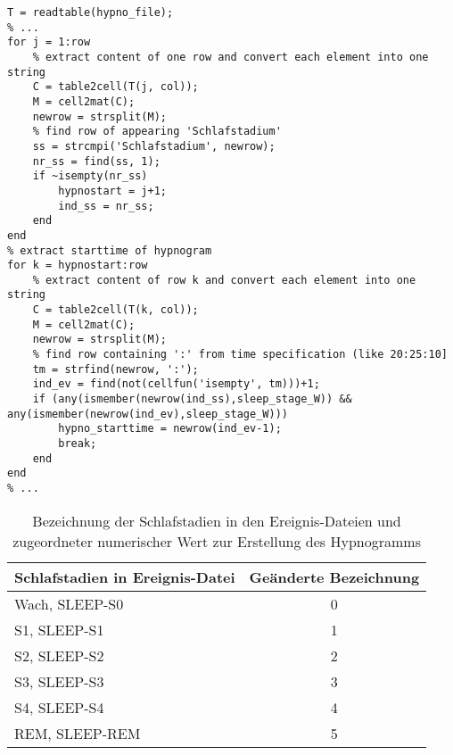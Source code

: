 
\begin{lstlisting}[caption={Implementierung Kriterium D1 in Skript restructure\_hypnogram.m}, label={lst:D1}]
T = readtable(hypno_file);
% ...
for j = 1:row
    % extract content of one row and convert each element into one string
    C = table2cell(T(j, col));
    M = cell2mat(C);
    newrow = strsplit(M);
    % find row of appearing 'Schlafstadium'
    ss = strcmpi('Schlafstadium', newrow);
    nr_ss = find(ss, 1);
    if ~isempty(nr_ss)
        hypnostart = j+1;
        ind_ss = nr_ss;
    end
end
% extract starttime of hypnogram
for k = hypnostart:row
    % extract content of row k and convert each element into one string
    C = table2cell(T(k, col));
    M = cell2mat(C);
    newrow = strsplit(M);
    % find row containing ':' from time specification (like 20:25:10]
    tm = strfind(newrow, ':');
    ind_ev = find(not(cellfun('isempty', tm)))+1;
    if (any(ismember(newrow(ind_ss),sleep_stage_W)) && any(ismember(newrow(ind_ev),sleep_stage_W)))
        hypno_starttime = newrow(ind_ev-1);
        break;
    end
end
% ...
\end{lstlisting}

\begin{table}[H] 
\centering
\begin{tabularx}{0.785\textwidth}{Xc}
\toprule
\multicolumn{1}{l}{\textbf{Schlafstadien in Ereignis-Datei}} & \multicolumn{1}{c}{\textbf{Geänderte Bezeichnung}}\\
\midrule 
Wach, SLEEP-S0 & 0\\
S1, SLEEP-S1 & 1\\
S2, SLEEP-S2 & 2\\
S3, SLEEP-S3 & 3\\
S4, SLEEP-S4 & 4\\
REM, SLEEP-REM & 5\\
\bottomrule
\end{tabularx}
\caption[Bezeichnung der Schlafstadien]{Bezeichnung der Schlafstadien in den Ereignis-Dateien und zugeordneter numerischer Wert zur Erstellung des Hypnogramms}
\label{tab:schlafstadien}
\end{table}
 
